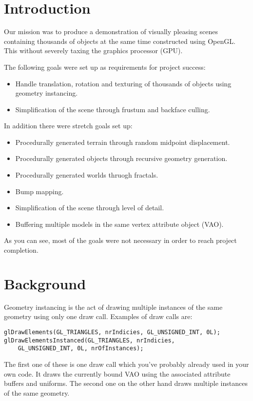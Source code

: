 \documentclass[a4paper,12pt]{article}
\begin{document}
\section{Introduction}

Our mission was to produce a demonstration of visually pleasing scenes containing thousands of objects at the same time constructed using OpenGL. This without severely taxing the graphics processor (GPU).

The following goals were set up as requirements for project success:

\begin{itemize}
\item Handle translation, rotation and texturing of thousands of objects using geometry instancing.
\item Simplification of the scene through frustum and backface culling.
\end{itemize}

In addition there were stretch goals set up:
\begin{itemize}
\item Procedurally generated terrain through random midpoint displacement.
\item Procedurally generated objects through recursive geometry generation.
\item Procedurally generated worlds thruogh fractals.
\item Bump mapping.
\item Simplification of the scene through level of detail.
\item Buffering multiple models in the same vertex attribute object (VAO).
\end{itemize}

As you can see, most of the goals were not necessary in order to reach project completion.

\section{Background}

Geometry instancing is the act of drawing multiple instances of the same geometry using only one draw call. Examples of draw calls are:

\begin{lstlisting}
glDrawElements(GL_TRIANGLES, nrIndicies, GL_UNSIGNED_INT, 0L);
glDrawElementsInstanced(GL_TRIANGLES, nrIndicies,
    GL_UNSIGNED_INT, 0L, nrOfInstances);
\end{lstlisting}
\noindent
The first one of these is one draw call which you've probably already used in your own code. It draws the currently bound VAO using the associated attribute buffers and uniforms. The second one on the other hand draws multiple instances of the same geometry.
\end{document}
